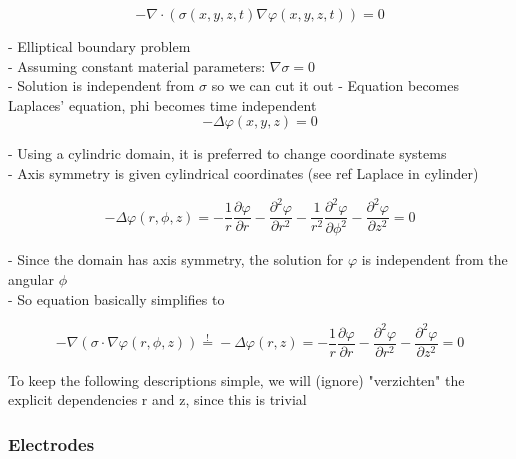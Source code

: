 \documentclass[parskip=half, titlepage=yes, 12pt, BCOR=12mm, DIV=calc]{scrartcl}
\begin{document}
\begin{equation}
    - \nabla \cdot (\sigma(x,y,z,t) \nabla \varphi(x,y,z,t)) = 0
\end{equation}

- Elliptical boundary problem \\
- Assuming constant material parameters: $\nabla \sigma = 0$ \\
- Solution is independent from $\sigma$ so we can cut it out
- Equation becomes Laplaces' equation, phi becomes time independent \\

\begin{equation}
    - \Delta \varphi(x,y,z) = 0
\end{equation}

- Using a cylindric domain, it is preferred to change coordinate systems \\
- Axis symmetry is given cylindrical coordinates (see ref Laplace in cylinder)

\begin{equation}
    - \Delta \varphi(r,\phi,z) = - \frac{1}{r} \frac{\partial \varphi}{\partial r} - \frac{\partial^2 \varphi}{\partial r^2} - \frac{1}{r^2} \frac{\partial^2 \varphi}{\partial \phi^2} -      \frac{\partial^2 \varphi}{\partial z^2}  = 0
\end{equation}

- Since the domain has axis symmetry, the solution for $\varphi$ is independent from the angular $\phi$ \\
- So equation basically simplifies to 


\begin{equation}
    - \nabla  ( \sigma \cdot \nabla \varphi(r,\phi,z)) \overset{!}{=} - \Delta \varphi(r,z) = - \frac{1}{r} \frac{\partial \varphi}{\partial r} - \frac{\partial^2 \varphi}{\partial r^2} - \frac{\partial^2 \varphi}{\partial z^2} = 0
\end{equation}

To keep the following descriptions simple, we will (ignore) "verzichten" the explicit dependencies r and z, since this is trivial

\subsubsection{Electrodes}
\end{document}
